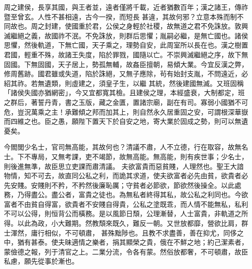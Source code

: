 \begin{pinyinscope}
 周之建侯，長享其國，與王者並，遠者僅將千載，近者猶數百年；漢之諸王，傳祚暨至曾玄。人性不甚相遠，古今一揆，而短長
 甚違，其故何邪？立意本殊而制不同故也。周之封建，使國重於君，公侯之身輕於社稷，故無道之君不免誅放。敦興滅繼絕之義，故國祚不泯。不免誅放，則群后思懼；胤嗣必繼，是無亡國也。諸侯思懼，然後軌道，下無亡國，天子乘之，理勢自安，此周室所以長在也。漢之樹置君國，輕重不殊，故諸王失度，陷於罪戮，國隨以亡。不崇興滅繼絕之序，故下無固國。下無固國，天子居上，勢孤無輔，故姦臣擅朝，易傾大業。今宜反漢之弊，修周舊跡。國君雖或失道，陷於誅絕，又無子應除，茍有始封支胤，不問遠近，必紹其祚。若無遺類，則虛建之，須皇子生，以繼
 其統，然後建國無滅。又班固稱「諸侯失國亦猶網密」，今又宜都寬其檢。且建侯之理，本經盛衰，大制都定，班之群后，著誓丹青，書之玉版，藏之金匱，置諸宗廟，副在有司。寡弱小國猶不可危，豈況萬乘之主！承難傾之邦而加其上，則自然永久居重固之安，可謂根深華嶽而四維之也。臣之愚，願陛下置天下於自安之地，寄大業於固成之勢，則可以無遺憂矣。



 今閻閭少名士，官司無高能，其故何也？清議不肅，人不立德，行在取容，故無名士。下不專局，又無考課，吏不竭節，故無高能。無高能，則有疾世事；少名士，則後進無準，故臣思立吏課而肅清議。
 夫欲富貴而惡貧賤，人理然也。聖王大諳物情，知不可去，故直同公私之利，而詭其求道，使夫欲富者必先由貧，欲貴者必先安賤。安賤則不矜，不矜然後廉恥厲；守貧者必節欲，節欲然後操全。以此處務，乃得盡公。盡公者，富貴之徒也。為無私者終得其私，故公私之利同也。今欲富者不由貧自得富，欲貴者不安賤自得貴，公私之塗既乖，而人情不能無私，私利不可以公得，則恒背公而橫務。是以風節日頹，公理漸替，人士富貴，非軌道之所得。以此為政，小大難期。然教頹來既久，難反一朝。又世放都靡，營欲比肩，群士渾然，庸行相似，不可頓肅，
 甚殊黜陟也。且教不求盡善，善在抑尤，同侈之中，猶有甚泰。使夫昧適情之樂者，捐其顯榮之貴，俄在不鮮之地；約己潔素者，蒙儉德之報，列于清官之上。二業分流，令各有蒙。然俗放都奢，不可頓肅，故臣私慮，願先從事於漸也。




\end{pinyinscope}
